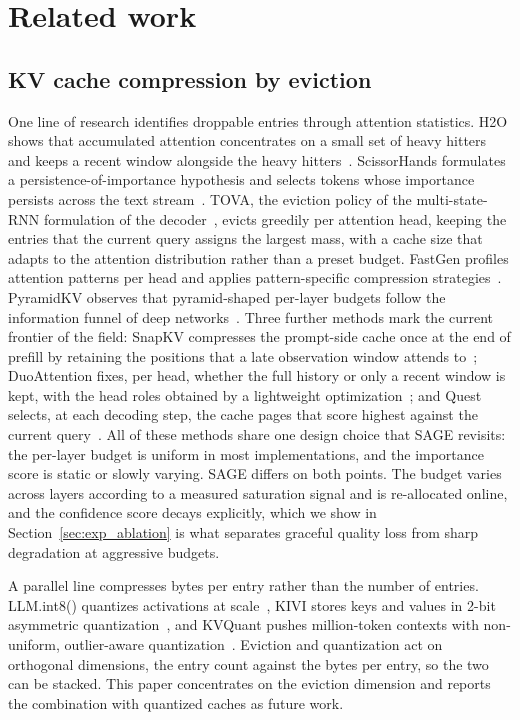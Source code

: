 \section{Related work}\label{sec:related}

\subsection{KV cache compression by eviction}

One line of research identifies droppable entries through attention
statistics. H2O shows that accumulated attention concentrates on a
small set of heavy hitters and keeps a recent window alongside the
heavy hitters~\cite{zhang2023h2o}. ScissorHands formulates a
persistence-of-importance hypothesis and selects tokens whose
importance persists across the text
stream~\cite{liu2023scissorhands}. TOVA, the eviction policy of the
multi-state-RNN formulation of the
decoder~\cite{oren2024tova}, evicts greedily per attention head,
keeping the entries that the current query assigns the largest
mass, with a cache size that adapts to the attention distribution
rather than a preset budget. FastGen profiles attention patterns per head and applies
pattern-specific compression strategies~\cite{ge2023model}. PyramidKV
observes that pyramid-shaped per-layer budgets follow the information
funnel of deep networks~\cite{zhang2024pyramidkv}. Three further
methods mark the current frontier of the field: SnapKV compresses
the prompt-side cache once at the end of prefill by retaining the
positions that a late observation window attends
to~\cite{li2024snapkv}; DuoAttention fixes, per head, whether the
full history or only a recent window is kept, with the head roles
obtained by a lightweight optimization~\cite{xiao2024duoattention};
and Quest selects, at each decoding step, the cache pages that score
highest against the current query~\cite{tang2024quest}. All of these
methods share one design choice that SAGE revisits: the per-layer
budget is uniform in most implementations, and the importance score
is static or slowly varying. SAGE differs on both points. The budget
varies across layers according to a measured saturation signal and is
re-allocated online, and the confidence score decays explicitly, which we show in
Section~\ref{sec:exp_ablation} is what separates graceful quality
loss from sharp degradation at aggressive budgets.

A parallel line compresses bytes per entry rather than the number of
entries. LLM.int8() quantizes activations at
scale~\cite{dettmers2022llmint8}, KIVI stores keys and values in 2-bit
asymmetric quantization~\cite{liu2024kivi}, and KVQuant pushes
million-token contexts with non-uniform, outlier-aware
quantization~\cite{hooper2024kvquant}. Eviction and quantization act
on orthogonal dimensions, the entry count against the bytes per entry,
so the two can be stacked. This paper concentrates on the eviction
dimension and reports the combination with quantized caches as future
work.

